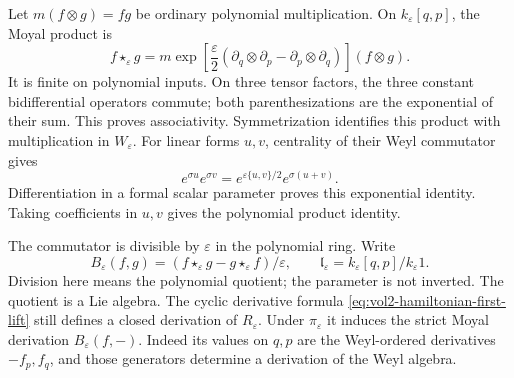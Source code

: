 Let $m(f\otimes g)=fg$ be ordinary polynomial multiplication.
On $k_\varepsilon[q,p]$, the Moyal product is
\begin{equation}\label{eq:vol2-coefficient-moyal-product}
 f\star_\varepsilon g
 =m\exp\!\left[\frac\varepsilon2
       (\partial_q\otimes\partial_p-\partial_p\otimes\partial_q)
       \right](f\otimes g).
\end{equation}
It is finite on polynomial inputs. On three tensor factors,
the three constant bidifferential operators commute; both
parenthesizations are the exponential of their sum. This
proves associativity. Symmetrization identifies this product
with multiplication in $W_\varepsilon$. For linear forms $u,v$,
centrality of their Weyl commutator gives
\[
 e^{\sigma u}e^{\sigma v}
   =e^{\varepsilon\{u,v\}/2}e^{\sigma(u+v)}.
\]
Differentiation in a formal scalar parameter proves this
exponential identity. Taking coefficients in $u,v$ gives the
polynomial product identity.

The commutator is divisible by $\varepsilon$ in the polynomial
ring. Write
\[
 B_\varepsilon(f,g)=
          (f\star_\varepsilon g-g\star_\varepsilon f)/\varepsilon,
 \qquad
 \mathfrak l_\varepsilon=k_\varepsilon[q,p]/k_\varepsilon1.
\]
Division here means the polynomial quotient; the parameter is
not inverted. The quotient is a Lie algebra. The cyclic
derivative formula \eqref{eq:vol2-hamiltonian-first-lift}
still defines a closed derivation of $R_\varepsilon$.
Under $\pi_\varepsilon$ it induces the strict Moyal
derivation $B_\varepsilon(f,-)$. Indeed its values on $q,p$
are the Weyl-ordered derivatives $-f_p,f_q$, and those
generators determine a derivation of the Weyl algebra.

